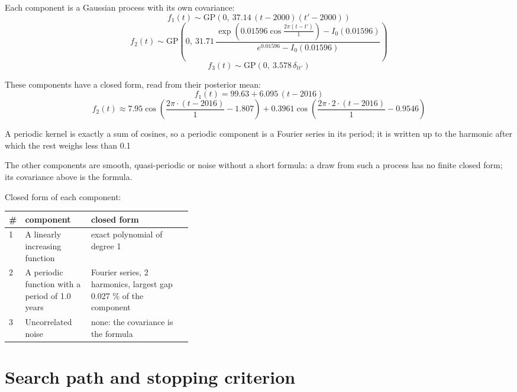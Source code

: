 \documentclass[11pt,a4paper]{article}
\begin{document}
Each component is a Gaussian process with its own covariance:
\begin{dmath*}
f_{1}(t) \sim \mathrm{GP}\!\left(0,\ 37.14\,(t - 2000)(t' - 2000)\right)
\end{dmath*}
\begin{dmath*}
f_{2}(t) \sim \mathrm{GP}\!\left(0,\ 31.71\,\frac{\exp\!\left(0.01596\cos\frac{2\pi (t - t')}{1}\right) - I_0(0.01596)}{e^{0.01596} - I_0(0.01596)}\right)
\end{dmath*}
\begin{dmath*}
f_{3}(t) \sim \mathrm{GP}\!\left(0,\ 3.578\,\delta_{t t'}\right)
\end{dmath*}

These components have a closed form, read from their posterior mean:
\begin{dmath*}
f_{1}(t) = 99.63 + 6.095\,(t - 2016)
\end{dmath*}
\begin{dmath*}
f_{2}(t) \approx 7.95\cos\!\left(\frac{2\pi \cdot (t - 2016)}{1} - 1.807\right) + 0.3961\cos\!\left(\frac{2\pi \cdot 2 \cdot (t - 2016)}{1} - 0.9546\right)
\end{dmath*}

A periodic kernel is exactly a sum of cosines, so a periodic component is a Fourier series in its period; it is written up to the harmonic after which the rest weighs less than 0.1 %

The other components are smooth, quasi-periodic or noise without a short formula: a draw from such a process has no finite closed form; its covariance above is the formula.

Closed form of each component:

\begin{center}\footnotesize
\begin{tabular}{lp{0.36\linewidth}l}
\toprule
\# & component & closed form \\
\midrule
1 & A linearly increasing function & exact polynomial of degree 1 \\
2 & A periodic function with a period of 1.0 years & Fourier series, 2 harmonics, largest gap 0.027 \% of the component \\
3 & Uncorrelated noise & none: the covariance is the formula \\
\bottomrule
\end{tabular}
\end{center}

\section*{Search path and stopping criterion}
\end{document}
